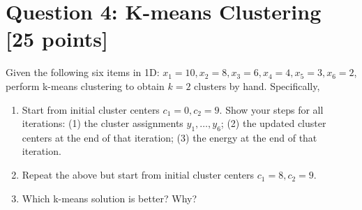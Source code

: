 \documentclass{article}
\begin{document}
\section*{Question 4: K-means Clustering [25 points]}
Given the following six items in 1D: $x_1=10, x_2=8, x_3=6, x_4=4, x_5=3, x_6=2$, perform k-means clustering to obtain $k=2$ clusters by hand.
Specifically,
\begin{enumerate}
\item Start from initial cluster centers $c_1=0, c_2=9$.  Show your steps for all iterations: (1) the cluster assignments $y_1, \ldots, y_6$; (2) the updated cluster centers at the end of that iteration; (3) the energy at the end of that iteration.
\item Repeat the above but start from initial cluster centers $c_1=8, c_2=9$.
\item Which k-means solution is better?  Why?
\end{enumerate}
\end{document}
